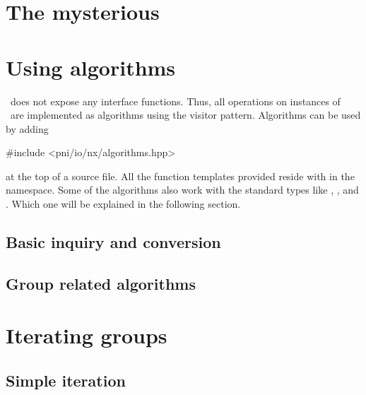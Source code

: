 \section{The mysterious \nxobject}\label{section:nxobject}



\section{Using algorithms}\label{section:algorithms}

\nxobject\ does not expose any interface functions. Thus, all operations on 
instances of \nxobject\ are implemented as algorithms using the visitor pattern. 
Algorithms can be used by adding 
\begin{cppcode}
#include <pni/io/nx/algorithms.hpp>
\end{cppcode}
at the top of a source file. All the function templates provided 
reside with in the  namespace. 
Some of the algorithms also work with the standard types like \nxfield,
\nxgroup, and \nxattribute. Which one will be explained in the following
section.

\subsection{Basic inquiry and conversion}



\subsection{Group related algorithms}


\section{Iterating groups}\label{section:group_iteration}

\subsection{Simple iteration}

